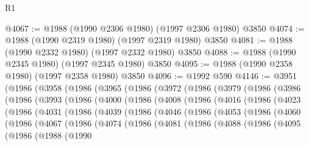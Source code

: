 \begin{lexlean}{R1}
\begin{coremodule}
@4067 := @1988 (@1990 @2306 @1980) (@1997 @2306 @1980) @3850
@4074 := @1988 (@1990 @2319 @1980) (@1997 @2319 @1980) @3850
@4081 := @1988 (@1990 @2332 @1980) (@1997 @2332 @1980) @3850
@4088 := @1988 (@1990 @2345 @1980) (@1997 @2345 @1980) @3850
@4095 := @1988 (@1990 @2358 @1980) (@1997 @2358 @1980) @3850
@4096 := @1992 @590
@4146 := @3951
    (@1986
      (@3958
        (@1986
          (@3965
            (@1986
              (@3972
                (@1986
                  (@3979
                    (@1986
                      (@3986
                        (@1986
                          (@3993
                            (@1986
                              (@4000
                                (@1986
                                  (@4008
                                    (@1986
                                      (@4016
                                        (@1986
                                          (@4023
                                            (@1986
                                              (@4031
                                                (@1986
                                                  (@4039
                                                    (@1986
                                                      (@4046
                                                        (@1986
                                                          (@4053
                                                            (@1986
                                                              (@4060
                                                                (@1986
                                                                  (@4067
                                                                    (@1986
                                                                      (@4074
                                                                        (@1986
                                                                          (@4081
                                                                            (@1986
                                                                              (@4088
                                                                                (@1986
                                                                                  (@4095
                                                                                    (@1986
                                                                                      (@1988
                                                                                        (@1990

\end{coremodule}
\end{lexlean}
